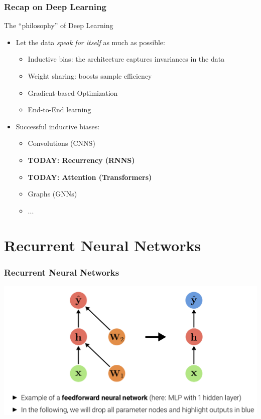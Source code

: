 \documentclass[10pt]{beamer}
\begin{document}
\begin{frame}
  \frametitle{Recap on Deep Learning}
	The ``philosophy'' of Deep Learning
	\vspace{.25cm}
	\begin{itemize}
	\item Let the data \emph{speak for itself} as much as possible:
	\begin{itemize}
	\vspace{.1cm}	\item {\color{blue} Inductive bias}: the architecture captures invariances in the data
	\vspace{.1cm}	\item {\color{blue} Weight sharing}: boosts sample efficiency
	\vspace{.1cm}	\item {\color{blue} Gradient-based} Optimization
	\vspace{.1cm}	\item {\color{blue} End-to-End} learning
	\end{itemize}
	\vspace{.25cm}
	\item Successful inductive biases:
	\begin{itemize}
	\vspace{.1cm}	\item Convolutions (CNNS)
	\vspace{.1cm}	\item \textbf{TODAY: Recurrency (RNNS)}
	\vspace{.1cm}	\item \textbf{TODAY: Attention (Transformers)}
	\vspace{.1cm}	\item Graphs (GNNs)
	\item ...
	\end{itemize}
	\end{itemize}
\end{frame}


\section{Recurrent Neural Networks}

\begin{frame}
  \frametitle{Recurrent Neural Networks}
\begin{center}
\includegraphics[width=.9\textwidth]{images/s1}
\end{center}
\end{frame}
\end{document}
